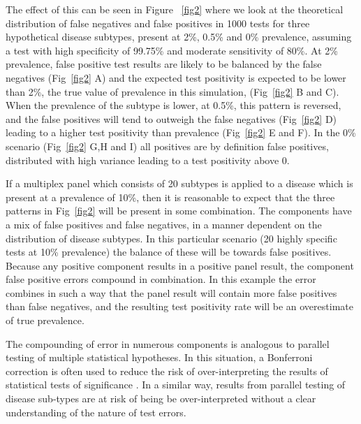\documentclass[10pt,letterpaper]{article}
\begin{document}
The effect of this can be seen in Figure ~\ref{fig2} where we look at the theoretical distribution of false negatives and false positives in 1000 tests for three hypothetical disease subtypes, present at 2\%, 0.5\% and 0\% prevalence, assuming a test with high specificity of 99.75\% and moderate sensitivity of 80\%. At 2\% prevalence, false positive test results are likely to be balanced by the false negatives (Fig~\ref{fig2} A) and the expected test positivity is expected to be lower than 2\%, the true value of prevalence in this simulation, (Fig~\ref{fig2} B and C). When the prevalence of the subtype is lower, at 0.5\%, this pattern is reversed, and the false positives will tend to outweigh the false negatives (Fig~\ref{fig2} D) leading to a higher test positivity than prevalence (Fig~\ref{fig2} E and F). In the 0\% scenario (Fig~\ref{fig2} G,H and I) all positives are by definition false positives,  distributed with high variance leading to a test positivity above 0.

If a multiplex panel which consists of 20 subtypes is applied to a disease which is present at a prevalence of 10\%, then it is reasonable to expect that the three patterns in Fig~\ref{fig2} will be present in some combination. The components have a mix of false positives and false negatives, in a manner dependent on the distribution of disease subtypes. In this particular scenario (20 highly specific tests at 10\% prevalence) the balance of these will be towards false positives. Because any positive component results in a positive panel result, the component false positive errors compound in combination. In this example the error combines in such a way that the panel result will contain more false positives than false negatives, and the resulting test positivity rate will be an overestimate of true prevalence.


The compounding of error in numerous components is analogous to parallel testing of multiple statistical hypotheses. In this situation, a Bonferroni correction is often used to reduce the risk of over-interpreting the results of statistical tests of significance \cite{shaffer1995}. In a similar way, results from parallel testing of disease sub-types are at risk of being be over-interpreted without a clear understanding of the nature of test errors.
\end{document}
